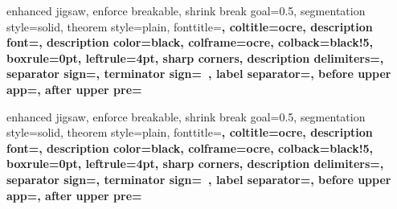 %
{enhanced jigsaw,%
	enforce breakable,%
	shrink break goal=0.5\baselineskip,%
	segmentation style=solid,%
	theorem style=plain,%
	fonttitle=\sffamily\upshape\bfseries\small,%
	coltitle=ocre,%
	description font=\sffamily\upshape\bfseries\small,%
	description color=black,%
	colframe=ocre,%
	colback=black!5,%
	boxrule=0pt,%
	leftrule=4pt,%
	sharp corners,%
	description delimiters={}{},%
	separator sign={\nobreakspace {\color{black}---}},%
	terminator sign={\ },%
	label separator=,
	before upper app={},%
	after upper pre={\popdimen{\parindent}}}%
{}

%
{enhanced jigsaw,%
	enforce breakable,%
	shrink break goal=0.5\baselineskip,%
	segmentation style=solid,%
	theorem style=plain,%
	fonttitle=\sffamily\upshape\bfseries\small,%
	coltitle=ocre,%
	description font=\sffamily\upshape\bfseries\small,%
	description color=black,%
	colframe=ocre,%
	colback=black!5,%
	boxrule=0pt,%
	leftrule=4pt,%
	sharp corners,%
	description delimiters={}{},%
	separator sign={\nobreakspace {\color{black}---}},%
	terminator sign={\ },%
	label separator=,
	before upper app={},%
	after upper pre={\popdimen{\parindent}}}%
{}


